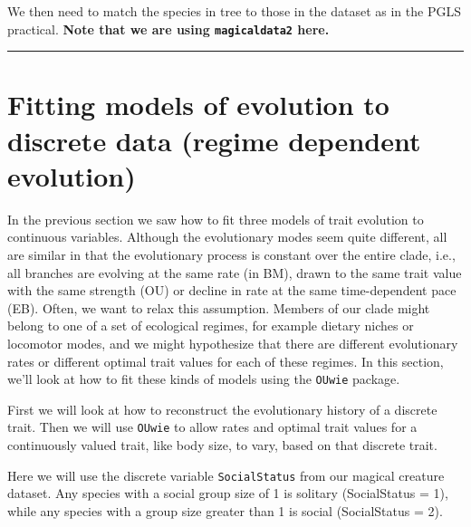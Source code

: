 \documentclass[]{book}
\newenvironment{Shaded}{\begin{snugshade}}{\end{snugshade}}
\newcommand{\KeywordTok}[1]{\textcolor[rgb]{0.13,0.29,0.53}{\textbf{{#1}}}}
\newcommand{\StringTok}[1]{\textcolor[rgb]{0.31,0.60,0.02}{{#1}}}
\newcommand{\NormalTok}[1]{{#1}}
\begin{document}
We then need to match the species in tree to those in the dataset as in
the PGLS practical. \textbf{Note that we are using \texttt{magicaldata2}
here.}

\begin{Shaded}
\end{Shaded}

\begin{center}\rule{0.5\linewidth}{\linethickness}\end{center}

\section{Fitting models of evolution to discrete data (regime dependent
evolution)}\label{fitting-models-of-evolution-to-discrete-data-regime-dependent-evolution}

In the previous section we saw how to fit three models of trait
evolution to continuous variables. Although the evolutionary modes seem
quite different, all are similar in that the evolutionary process is
constant over the entire clade, i.e., all branches are evolving at the
same rate (in BM), drawn to the same trait value with the same strength
(OU) or decline in rate at the same time-dependent pace (EB). Often, we
want to relax this assumption. Members of our clade might belong to one
of a set of ecological regimes, for example dietary niches or locomotor
modes, and we might hypothesize that there are different evolutionary
rates or different optimal trait values for each of these regimes. In
this section, we'll look at how to fit these kinds of models using the
\texttt{OUwie} package.

First we will look at how to reconstruct the evolutionary history of a
discrete trait. Then we will use \texttt{OUwie} to allow rates and
optimal trait values for a continuously valued trait, like body size, to
vary, based on that discrete trait.

Here we will use the discrete variable \texttt{SocialStatus} from our
magical creature dataset. Any species with a social group size of 1 is
solitary (SocialStatus = 1), while any species with a group size greater
than 1 is social (SocialStatus = 2).
\end{document}

